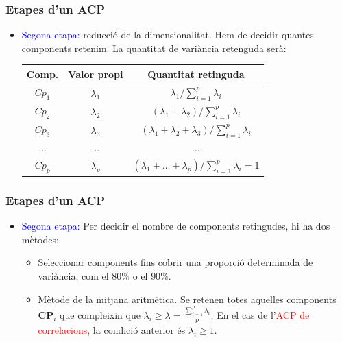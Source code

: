 \documentclass[12pt,t]{beamer}
\newcommand{\red}[1]{\textcolor{red}{#1}}
\newcommand{\blue}[1]{\textcolor{blue}{#1}}
\renewcommand{\geq}{\geqslant}
\theoremstyle{plain}
\theoremstyle{definition}
\begin{document}
\begin{frame}
\frametitle{Etapes d'un ACP}
\begin{itemize}
\item \blue{Segona etapa:} reducció de la dimensionalitat. Hem de decidir quantes components retenim. La quantitat de 
variància retenguda serà:
\begin{center}
\begin{tabular}{|c|c|c|}\hline
Comp. & Valor propi & Quantitat retinguda\\\hline
$Cp_1$  & $\lambda_1$ & $\lambda_1/\sum_{i=1}^p \lambda_i$\\
$Cp_2 $ & $\lambda_2$ & $(\lambda_1+\lambda_2)/\sum_{i=1}^p \lambda_i$\\
$Cp_3$ & $\lambda_3$ &
$(\lambda_1+\lambda_2+\lambda_3)/\sum_{i=1}^p
\lambda_i$\\ $\ldots$ & $\ldots$ & $\ldots$\\
$Cp_p$ & $\lambda_p$ &
$(\lambda_1+\ldots+\lambda_p)/\sum_{i=1}^p \lambda_i=1$\\\hline
\end{tabular}
\end{center}
\end{itemize}
\end{frame}


\begin{frame}
\frametitle{Etapes d'un ACP}
\begin{itemize}
\item \blue{Segona etapa:} Per decidir el  nombre de components retingudes, hi ha dos mètodes:
\begin{itemize}
\item Seleccionar components fins cobrir una proporció determinada de variància, com el $80\%$ o el $90\%$. 
\item Mètode de la mitjana aritmètica. Se retenen totes aquelles components $\mathbf{CP}_i$ que compleixin que 
$\lambda_i \geq \overline{\lambda}=\frac{\sum_{i=1}^p \lambda_i}{p}$. En el cas de l'\red{ACP de correlacions}, la 
condició anterior és $\lambda_i\geq 1$.
\end{itemize}
\end{itemize}
\end{frame}
\end{document}
